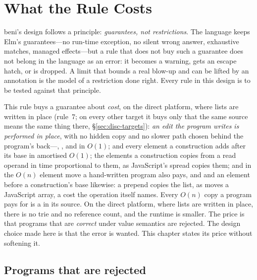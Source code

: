 \chapter{What the Rule Costs}
\label{sec:discussion}

beni's design follows a principle: \emph{guarantees, not restrictions}. The language keeps Elm's
guarantees---no run-time exception, no silent wrong answer, exhaustive matches, managed effects---but a
rule that does not buy such a guarantee does not belong in the language as an error: it becomes a
warning, gets an escape hatch, or is dropped. A limit that bounds a real blow-up and can be lifted
by an annotation is the model of a restriction done right. Every rule in this design is to be tested
against that principle.

This rule buys a guarantee about \emph{cost}, on the direct platform, where lists are written in place
(rule~7; on every other target it buys only that the same source means the same thing there,
\S\ref{sec:disc-targets}): \emph{an edit the program writes is performed in place},
with no hidden copy and no slower path chosen behind the program's back---, ,
 and  in $O(1)$;  and every element a construction adds after its base in
amortised $O(1)$; the elements a construction copies from a read operand in time proportional to them, as
JavaScript's spread copies them;  and  in the $O(n)$ element move a
hand-written program also pays, and  and an element before a construction's base likewise: a
prepend copies the list, as  moves a JavaScript array, a cost the operation itself names. Every $O(n)$ copy a program pays for is a
 in its source. On the direct platform, where lists are written in place, there is no trie
and no reference count, and the runtime is smaller. The
price is that programs that are \emph{correct} under value semantics are rejected. The design choice made
here is that the error is wanted. This chapter states its price without softening it.

\section{Programs that are rejected}
\label{sec:disc-rejected}

